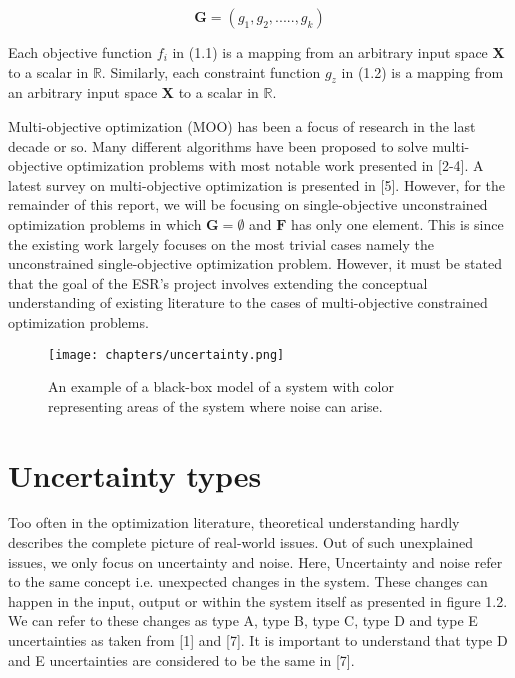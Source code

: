 \begin{equation}
\textbf{G} = ({g}_1,{g}_2,.....,{g}_k)
\end{equation}

Each objective function $f_{i}$ in (1.1) is a mapping from an arbitrary input space \textbf{X} to a scalar in $\mathbb{R}$. Similarly, each constraint function $g_{z}$ in (1.2) is a mapping from an arbitrary input space \textbf{X} to a scalar in $\mathbb{R}$. 

Multi-objective optimization (MOO) has been a focus of research in the last decade or so. Many different algorithms have been proposed to solve multi-objective optimization problems with most notable work presented in [2-4]. A latest survey on multi-objective optimization is presented in [5]. However, for the remainder of this report, we will be focusing on single-objective unconstrained optimization problems in which $\textbf{G}=\emptyset$ and $ \textbf{F}$ has only one element. This is since the existing work largely focuses on the most trivial cases namely the unconstrained single-objective optimization problem. However, it must be stated that the goal of the ESR's project involves extending the conceptual understanding of existing literature to the cases of multi-objective constrained optimization problems. 

\begin{figure}
\centering
\texttt{[image: chapters/uncertainty.png]}
\caption{An example of a black-box model of a system with color representing areas of the system where noise can arise.}
\end{figure}


\section{Uncertainty types}
 Too often in the optimization literature, theoretical understanding hardly describes the complete picture of real-world issues. Out of such unexplained issues, we only focus on uncertainty and noise. Here, Uncertainty and noise refer to the same concept i.e. unexpected changes in the system. These changes can happen in the input, output or within the system itself as presented in figure 1.2. We can refer to these changes as type A, type B, type C, type D and type E uncertainties as taken from [1] and [7]. It is important to understand that type D and E uncertainties are considered to be the same in [7]. 
 

